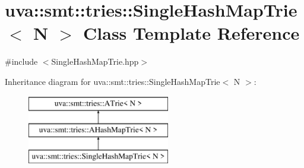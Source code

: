 \hypertarget{classuva_1_1smt_1_1tries_1_1_single_hash_map_trie}{}\section{uva\+:\+:smt\+:\+:tries\+:\+:Single\+Hash\+Map\+Trie$<$ N $>$ Class Template Reference}
\label{classuva_1_1smt_1_1tries_1_1_single_hash_map_trie}


{\ttfamily \#include $<$Single\+Hash\+Map\+Trie.\+hpp$>$}

Inheritance diagram for uva\+:\+:smt\+:\+:tries\+:\+:Single\+Hash\+Map\+Trie$<$ N $>$\+:\begin{figure}[H]
\begin{center}
\leavevmode
\includegraphics[height=3.000000cm]{classuva_1_1smt_1_1tries_1_1_single_hash_map_trie}
\end{center}
\end{figure}

